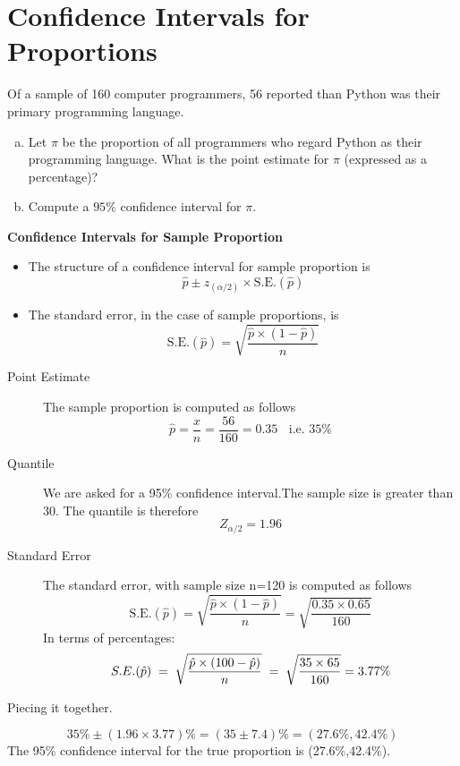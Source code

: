 \documentclass[a4paper,12pt]{article}
\begin{document}
\section*{Confidence Intervals for Proportions}
Of a sample of 160 computer programmers, 56 reported than Python was their primary programming language.
\begin{enumerate}[(a)]
	\item Let $\pi$ be the proportion of all programmers who regard Python as their programming language. What is the point estimate for $\pi$ (expressed as a percentage)?
	\item Compute a $95\%$ confidence interval for $\pi$.
\end{enumerate}

\begin{framed}
	\textbf{Confidence Intervals for Sample Proportion}
	
	\begin{itemize}
		\item The structure of a confidence interval for sample proportion is 
		\[ \hat{p} \pm z_{(\alpha/2)} \times \mbox{S.E.}(\hat{p})\]
		
		\item The standard error, in the case of sample proportions, is
		\[ \mbox{S.E.}(\hat{p}) = \sqrt{\frac{\hat{p}\times (1-\hat{p})}{n}}\]
		
	\end{itemize}
\end{framed}

\begin{description}
	\item[Point Estimate] The sample proportion is computed as follows
	\[ \hat{p} = \frac{x}{n} = \frac{56}{160} = 0.35 \;\; \mbox{ i.e. }35\%\]
	\item[Quantile] We are asked for a 95\% confidence interval.The sample size is greater than 30. The quantile is therefore
	\[ Z_{\alpha/2} =1.96\]
	\item[Standard Error] The standard error, with sample size n=120 is computed as follows
	\[ \mbox{S.E.}(\hat{p}) = \sqrt{\frac{\hat{p} \times (1-\hat{p})}{n}} =  \sqrt{\frac{0.35 \times 0.65}{160}}\]
\noindent In terms of percentages:
\[
S.E. (\hat{p}) \;=\; \sqrt{\frac{\hat{p} \times (100-\hat{p})}{n}} \;=\; \sqrt{ {35 \times 65 \over 160 }} =  3.77\%
\] 
\end{description}

\noindent Piecing it together.

\[
35\% \pm (1.96 \times 3.77) \%  = (35 \pm7.4) \% = (27.6\%,42.4\%)
\]
\smallskip
\noindent The 95\% confidence interval for the true proportion is (27.6\%,42.4\%).
\end{document}
